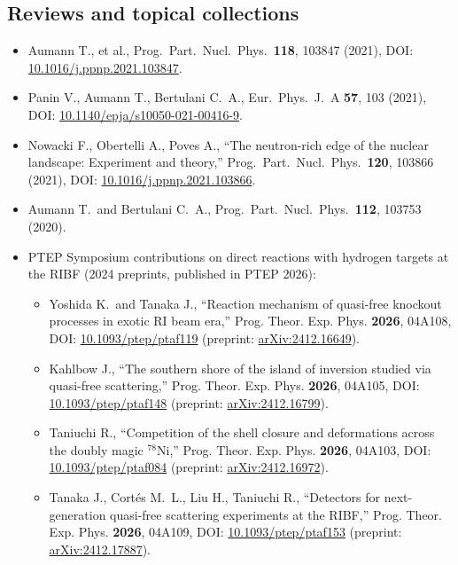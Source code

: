 \documentclass[a4paper, 11pt]{article}
\begin{document}
\subsection{Reviews and topical collections}
\begin{itemize}
  \item Aumann T., et al., Prog.\ Part.\ Nucl.\ Phys.\ \textbf{118}, 103847 (2021), DOI: \href{https://doi.org/10.1016/j.ppnp.2021.103847}{10.1016/j.ppnp.2021.103847}.
  \item Panin V., Aumann T., Bertulani C.\ A., Eur.\ Phys.\ J.\ A \textbf{57}, 103 (2021), DOI: \href{https://doi.org/10.1140/epja/s10050-021-00416-9}{10.1140/epja/s10050-021-00416-9}.
  \item Nowacki F., Obertelli A., Poves A., ``The neutron-rich edge of the nuclear landscape: Experiment and theory,'' Prog.\ Part.\ Nucl.\ Phys.\ \textbf{120}, 103866 (2021), DOI: \href{https://doi.org/10.1016/j.ppnp.2021.103866}{10.1016/j.ppnp.2021.103866}.
  \item Aumann T.\ and Bertulani C.\ A., Prog.\ Part.\ Nucl.\ Phys.\ \textbf{112}, 103753 (2020).
  \item PTEP Symposium contributions on direct reactions with hydrogen targets at the RIBF (2024 preprints, published in PTEP 2026):
  \begin{itemize}
    \item Yoshida K.\ and Tanaka J., ``Reaction mechanism of quasi-free knockout processes in exotic RI beam era,'' Prog. Theor. Exp. Phys. \textbf{2026}, 04A108, DOI: \href{https://doi.org/10.1093/ptep/ptaf119}{10.1093/ptep/ptaf119} (preprint: \href{https://arxiv.org/abs/2412.16649}{arXiv:2412.16649}).
    \item Kahlbow J., ``The southern shore of the island of inversion studied via quasi-free scattering,'' Prog. Theor. Exp. Phys. \textbf{2026}, 04A105, DOI: \href{https://doi.org/10.1093/ptep/ptaf148}{10.1093/ptep/ptaf148} (preprint: \href{https://arxiv.org/abs/2412.16799}{arXiv:2412.16799}).
    \item Taniuchi R., ``Competition of the shell closure and deformations across the doubly magic $^{78}$Ni,'' Prog. Theor. Exp. Phys. \textbf{2026}, 04A103, DOI: \href{https://doi.org/10.1093/ptep/ptaf084}{10.1093/ptep/ptaf084} (preprint: \href{https://arxiv.org/abs/2412.16972}{arXiv:2412.16972}).
    \item Tanaka J., Cortés M.\ L., Liu H., Taniuchi R., ``Detectors for next-generation quasi-free scattering experiments at the RIBF,'' Prog. Theor. Exp. Phys. \textbf{2026}, 04A109, DOI: \href{https://doi.org/10.1093/ptep/ptaf153}{10.1093/ptep/ptaf153} (preprint: \href{https://arxiv.org/abs/2412.17887}{arXiv:2412.17887}).
  \end{itemize}
\end{itemize}
\end{document}
